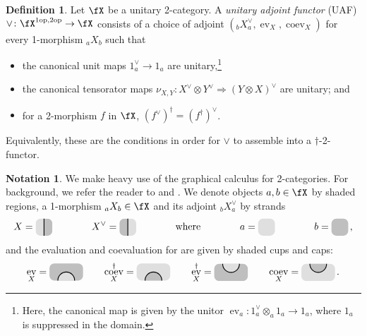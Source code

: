 \documentclass[12pt, reqno]{amsart}
\newcommand{\tikzmath}[2][]
{\vcenter{\hbox{\begin{tikzpicture}[#1]#2\end{tikzpicture}}}
}
\DeclareMathOperator{\coev}{coev}
\DeclareMathOperator{\ev}{ev}
\newcommand{\op}{\mathrm{op}}
\theoremstyle{plain}
\theoremstyle{definition}
\newtheorem{defn}[thm]{Definition}
\newtheorem{nota}[thm]{Notation}
\begin{document}
\begin{defn}\label{defn:UAF}
Let $\fX$ be a unitary 2-category. A \emph{unitary adjoint functor} (UAF) $\vee \colon \fX^{1\op,2\op} \to \fX$ consists of a choice of adjoint $({}_bX^\vee_a,\ev_X,\coev_X)$ for every 1-morphism ${}_aX_b$ such that
\begin{itemize}
    \item the canonical unit maps $1_a^\vee\to 1_a$ are unitary,\footnote{Here, the canonical map is given by the unitor $\ev_a: 1_a^\vee\otimes_a 1_a\to 1_a$, where $1_a$ is suppressed in the domain.}
    \item the canonical tensorator maps $\nu_{X,Y} \colon X^\vee \otimes Y^\vee \Rightarrow (Y \otimes X)^\vee$ are unitary; and
    \item for a 2-morphism $f$ in $\fX$, $(f^\vee)^\dag = (f^\dag)^\vee$.
\end{itemize}
Equivalently, these are the conditions in order for $\vee$ to assemble into a $\dag$-2-functor.
\end{defn}

\begin{nota}
We make heavy use of the graphical calculus for 2-categories.
For background, we refer the reader to \cite{MR3971584} and \cite{MR4419534}.
We denote objects $a,b\in\fX$ by shaded regions, a 1-morphism ${}_aX_b\in\fX$ and its adjoint ${}_bX^\vee_a$ by strands
$$
X=
\tikzmath{
\begin{scope}
\clip[rounded corners=5pt] (0,0) rectangle (.6,.6);
\fill[lightgray!50] (0,0) rectangle (.3,.6);    
\fill[lightgray] (.3,0) rectangle (.6,.6);    
\end{scope}
\draw[thick] (.3,0) -- (.3,.6);
}
\qquad\qquad
X^\vee=
\tikzmath{
\begin{scope}
\clip[rounded corners=5pt] (0,0) rectangle (.6,.6);
\fill[lightgray] (0,0) rectangle (.3,.6);    
\fill[lightgray!50] (.3,0) rectangle (.6,.6);    
\end{scope}
\draw[thick] (.3,0) -- (.3,.6);
}
\qquad\qquad\text{where}\qquad\qquad
a=
\tikzmath{
\fill[lightgray!50, rounded corners=5pt] (0,0) rectangle (.6,.6);    
}
\qquad\qquad
b=
\tikzmath{
\fill[lightgray, rounded corners=5pt] (0,0) rectangle (.6,.6);    
}
\,,
$$
and the evaluation and coevaluation for are given by shaded cups and caps:
$$
\ev_X =
\tikzmath{
\fill[lightgray, rounded corners=5pt] (0,0) rectangle (1.2,.6);
\draw[thick,fill=lightgray!50] (.3,0) arc(180:0:.3cm);
}
\qquad
\coev_X^\dag =
\tikzmath{
\fill[lightgray!50, rounded corners=5pt] (0,0) rectangle (1.2,.6);
\draw[thick,fill=lightgray] (.3,0) arc(180:0:.3cm);
}
\qquad
\ev_X^\dag =
\tikzmath{
\fill[lightgray, rounded corners=5pt] (0,0) rectangle (1.2,.6);
\draw[thick,fill=lightgray!50] (.3,.6) arc(-180:0:.3cm);
}
\qquad
\coev_X =
\tikzmath{
\fill[lightgray!50, rounded corners=5pt] (0,0) rectangle (1.2,.6);
\draw[thick,fill=lightgray] (.3,.6) arc(-180:0:.3cm);
}
\,.
$$
\end{nota}
\end{document}

